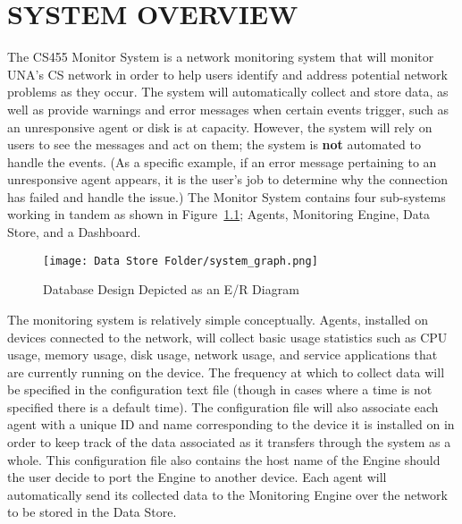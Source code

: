 \documentclass[letterpaper,12pt,oneside,listof=totoc]{scrreprt}
\begin{document}
\chapter{SYSTEM OVERVIEW}

The CS455 Monitor System is a network monitoring system that will monitor UNA's CS network in order to help users identify and address potential network problems as they occur. The system will automatically collect and store data, as well as provide warnings and error messages when certain events trigger, such as an unresponsive agent or disk is at capacity. However, the system will rely on users to see the messages and act on them; the system is \textbf{not} automated to handle the events. (As a specific example, if an error message pertaining to an unresponsive agent appears, it is the user's job to determine why the connection has failed and handle the issue.) The Monitor System contains four sub-systems working in tandem as shown in Figure~\ref{systemdiagram}; Agents, Monitoring Engine, Data Store, and a Dashboard.

\begin{figure}[h!]
\centering
\texttt{[image: Data Store Folder/system\_graph.png]}
\caption{Database Design Depicted as an E/R Diagram}
\label{systemdiagram}
\end{figure}

The monitoring system is relatively simple conceptually. Agents, installed on devices connected to the network, will collect basic usage statistics such as CPU usage, memory usage, disk usage, network usage, and service applications that are currently running on the device. The frequency at which to collect data will be specified in the configuration text file (though in cases where a time is not specified there is a default time). The configuration file will also associate each agent with a unique ID and name corresponding to the device it is installed on in order to keep track of the data associated as it transfers through the system as a whole. This configuration file also contains the host name of the Engine should the user decide to port the Engine to another device. Each agent will automatically send its collected data to the Monitoring Engine over the network to be stored in the Data Store.
\end{document}
